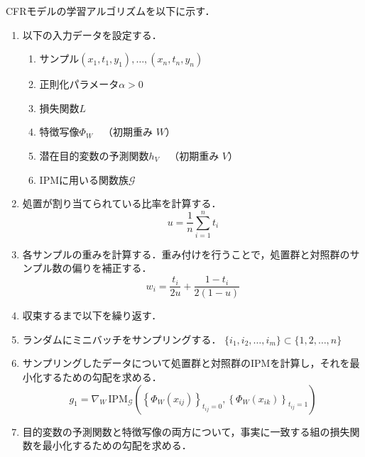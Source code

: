 \documentclass[dvipdfmx]{jreport}
\begin{document}
CFRモデルの学習アルゴリズムを以下に示す．
\begin{tcolorbox}[title=\textbf{CFRアルゴリズム}]
    \begin{enumerate}
        \item 以下の入力データを設定する．
        \begin{enumerate}
            \item サンプル\(
                (x_1, t_1, y_1), \dots, (x_n, t_n, y_n)
                \)
                \item 正則化パラメータ\(
                \alpha > 0
                \)
                \item 損失関数\(
                L
                \)
                \item 特徴写像\(
                \Phi_W \quad \text{（初期重み } W \text{）}
                \)
                \item 潜在目的変数の予測関数\(
                h_V \quad \text{（初期重み } V \text{）}
                \)
                \item IPMに用いる関数族\(
                \mathcal{G}
                \)
        \end{enumerate}
        \item 処置が割り当てられている比率を計算する．
        \begin{equation}
        u = \frac{1}{n} \sum_{i=1}^{n} t_i
        \end{equation}
        \item 各サンプルの重みを計算する．重み付けを行うことで，処置群と対照群のサンプル数の偏りを補正する．
        \begin{equation}
            w_i = \frac{t_i}{2u} + \frac{1 - t_i}{2(1 - u)}
            \end{equation}
        \item 収束するまで以下を繰り返す．
        \item ランダムにミニバッチをサンプリングする． $\{i_1, i_2, \dots, i_m\} \subset \{1, 2, \dots, n\}$
        \item サンプリングしたデータについて処置群と対照群のIPMを計算し，それを最小化するための勾配を求める．
        \begin{equation}
            g_1 = \nabla_W \, \mathrm{IPM}_{\mathcal{G}} \left( \left\{ \Phi_W(x_{ij}) \right\}_{t_{ij}=0}, \left\{ \Phi_W(x_{ik}) \right\}_{t_{ij}=1} \right)
        \end{equation}
        \item 目的変数の予測関数と特徴写像の両方について，事実に一致する組の損失関数を最小化するための勾配を求める．

\end{enumerate}
\end{tcolorbox}
\end{document}
